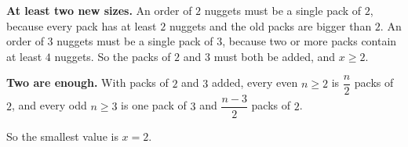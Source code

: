 \textbf{At least two new sizes.} An order of $2$ nuggets must be a single pack of $2$, because every pack has at least $2$ nuggets and the old packs are bigger than $2$. An order of $3$ nuggets must be a single pack of $3$, because two or more packs contain at least $4$ nuggets. So the packs of $2$ and $3$ must both be added, and $x\ge2$.

\textbf{Two are enough.} With packs of $2$ and $3$ added, every even $n\ge2$ is $\dfrac {n}{2}$ packs of $2$, and every odd $n\ge3$ is one pack of $3$ and $\dfrac{n-3}{2}$ packs of $2$.

So the smallest value is $x=\boxed{2}$.
